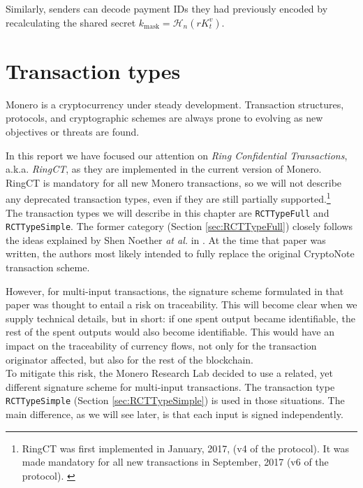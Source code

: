 Similarly, senders can decode payment IDs they had previously encoded by recalculating the shared secret $k_{\textrm{mask}} = \mathcal{H}_n(r K_t^v)$.

\section{Transaction types}
\label{sec:transaction_types}

Monero is a cryptocurrency under steady development. Transaction structures, protocols, and cryptographic schemes are always prone to evolving as new objectives or threats are found.

In this report we have focused our attention on {\em Ring Confidential Transactions}, a.k.a. {\em RingCT}, as they are implemented in the current version of Monero. RingCT is mandatory for all new Monero transactions, so we will not describe any deprecated transaction types, even if they are still partially supported.\footnote{RingCT was first implemented in January, 2017, (v4 of the protocol). It was made mandatory for all new transactions in September, 2017 (v6 of the protocol). \cite{ringct-dates}}
\\

The transaction types we will describe in this chapter are {\tt RCTTypeFull} and {\tt RCTTypeSimple}. The former category (Section \ref{sec:RCTTypeFull}) closely follows the ideas explained by Shen Noether {\em at al.} in \cite{MRL-0005}. At the time that paper was written, the authors most likely intended to fully replace the original CryptoNote transaction scheme.

However, for multi-input transactions, the signature scheme formulated in that paper was thought to entail a risk on traceability. This will become clear when we supply technical details, but in short: if one spent output became identifiable, the rest of the spent outputs would also become identifiable. This would have an impact on the traceability of currency flows, not only for the transaction originator affected, but also for the rest of the blockchain.
\\

To mitigate this risk, the Monero Research Lab decided to use a related, yet different signature scheme for multi-input transactions. The transaction type {\tt RCTTypeSimple} (Section \ref{sec:RCTTypeSimple}) is used in those situations. The main difference, as we will see later, is that each input is signed independently.

